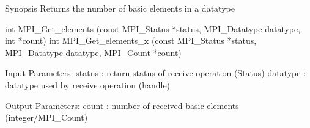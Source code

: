 Synopsis
Returns the number of basic elements in a datatype

int MPI_Get_elements
    (const MPI_Status *status, MPI_Datatype datatype, int *count)
int MPI_Get_elements_x
    (const MPI_Status *status, MPI_Datatype datatype, MPI_Count *count)

Input Parameters:
status : return status of receive operation (Status) 
datatype : datatype used by receive operation (handle) 

Output Parameters:
count : number of received basic elements (integer/MPI_Count)
